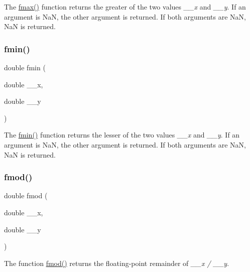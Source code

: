 The \hyperlink{group__avr__math_ga826d43c13b1800b7c906bd35e31ee15f}{fmax()} function returns the greater of the two values {\itshape \+\_\+\+\_\+x} and {\itshape \+\_\+\+\_\+y}. If an argument is NaN, the other argument is returned. If both arguments are NaN, NaN is returned. \mbox{\label{group__avr__math_gae5e2dea618087cda44f0998821c26c48}} 
\subsubsection{\texorpdfstring{fmin()}{fmin()}}
{\footnotesize\ttfamily double fmin (\begin{DoxyParamCaption}\item[{double}]{\+\_\+\+\_\+x,  }\item[{double}]{\+\_\+\+\_\+y }\end{DoxyParamCaption})}

The \hyperlink{group__avr__math_gae5e2dea618087cda44f0998821c26c48}{fmin()} function returns the lesser of the two values {\itshape \+\_\+\+\_\+x} and {\itshape \+\_\+\+\_\+y}. If an argument is NaN, the other argument is returned. If both arguments are NaN, NaN is returned. \mbox{\label{group__avr__math_gae20369249862b10d741eba7754bf733a}} 
\subsubsection{\texorpdfstring{fmod()}{fmod()}}
{\footnotesize\ttfamily double fmod (\begin{DoxyParamCaption}\item[{double}]{\+\_\+\+\_\+x,  }\item[{double}]{\+\_\+\+\_\+y }\end{DoxyParamCaption})}

The function \hyperlink{group__avr__math_gae20369249862b10d741eba7754bf733a}{fmod()} returns the floating-\/point remainder of {\itshape \+\_\+\+\_\+x / \+\_\+\+\_\+y}. \mbox{\label{group__avr__math_ga89f0cb053e3cdb0c9c952ef040087c80}} 

